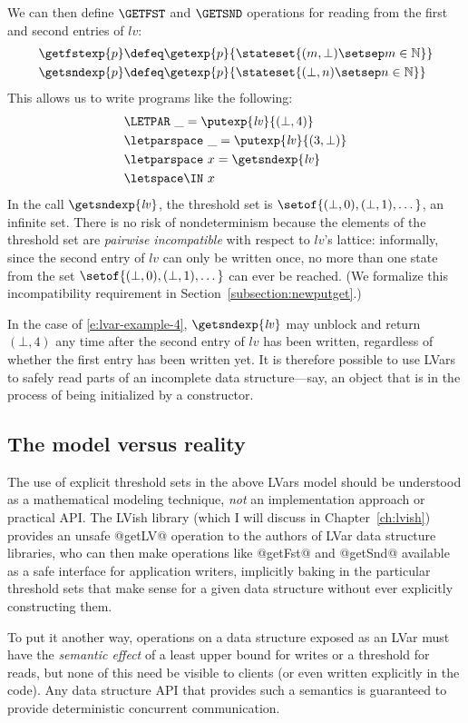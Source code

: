 We can then define $\GETFST$ and
$\GETSND$ operations for reading from the first and second entries of
$\mathit{lv}$:
\begin{align*}
\getfstexp{p} & \defeq \getexp{p}{\stateset{(m, \bot) \setsep m \in
    \mathbb{N}}} \\
\getsndexp{p} & \defeq \getexp{p}{\stateset{(\bot, n) \setsep n \in
    \mathbb{N}}}
\end{align*}
This allows us to write programs like the following:
\begin{equation}
\begin{split}
& \LETPAR ~\_ = \putexp{\mathit{lv}}{(\bot, 4)} \\
&  \letparspace ~\_ = \putexp{\mathit{lv}}{(3, \bot)} \\
&  \letparspace ~x = \getsndexp{\mathit{lv}} \\
&  \letspace \IN~x
\end{split}
\label{e:lvar-example-4}
\end{equation}
In the call $\getsndexp{\mathit{lv}}$, the threshold set is
$\setof{(\bot, 0), (\bot, 1), \dots}$, an infinite set.  There is no
risk of nondeterminism because the elements of the threshold set are
\emph{pairwise incompatible} with respect to $\mathit{lv}$'s lattice:
informally, since the second entry of $\mathit{lv}$ can only be
written once, no more than one state from the set $\setof{(\bot, 0),
  (\bot, 1), \dots}$ can ever be reached.  (We formalize this
incompatibility requirement in Section~\ref{subsection:newputget}.)

In the case of \ref{e:lvar-example-4}, $\getsndexp{\mathit{lv}}$ may
unblock and return $(\bot, 4)$ any time after the second entry of
$\mathit{lv}$ has been written, regardless of whether the first entry
has been written yet.  It is therefore possible to use LVars to safely
read parts of an incomplete data structure---say, an object that is in
the process of being initialized by a constructor.

\subsection{The model versus reality}

The use of explicit threshold sets in the above LVars model should be
understood as a mathematical modeling technique, \emph{not} an
implementation approach or practical API.  The LVish library (which I
will discuss in Chapter~\ref{ch:lvish}) provides an unsafe @getLV@
operation to the authors of LVar data structure libraries, who can
then make operations like @getFst@ and @getSnd@ available as a safe
interface for application writers, implicitly baking in the particular
threshold sets that make sense for a given data structure without ever
explicitly constructing them.

To put it another way, operations on a data structure exposed as an
LVar must have the \emph{semantic effect} of a least upper bound for
writes or a threshold for reads, but none of this need be visible to
clients (or even written explicitly in the code).  Any data structure
API that provides such a semantics is guaranteed to provide
deterministic concurrent communication.
